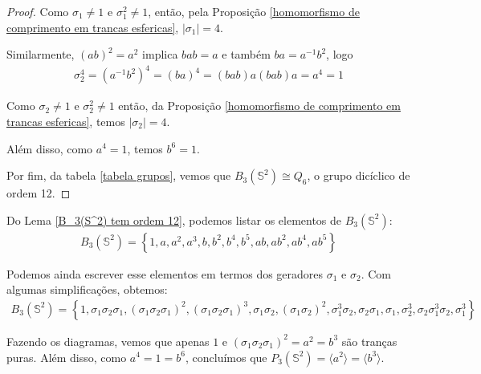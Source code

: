\documentclass[a4paper,portuguese,11pt,twoside, leqno]{book}
\theoremstyle{definition}
\begin{document}
\begin{proof}
		\par\vspace{0.3cm} Como $\sigma_1\neq 1$ e $\sigma_1^2\neq 1$, então, pela Proposição \eqref{homomorfismo de comprimento em trancas esfericas}, $|\sigma_1| = 4$.
		\par\vspace{0.3cm} Similarmente, $(ab)^2 = a^2$ implica $bab=a$ e também $ba=a^{-1}b^2$, logo
		\begin{align*}
		\sigma_2^4 = (a^{-1}b^2)^4 = (ba)^4 = (bab)a(bab)a = a^4 = 1
		\end{align*}
		\par\vspace{0.3cm} Como $\sigma_2\neq1$ e $\sigma_2^2\neq1$ então, da Proposição \eqref{homomorfismo de comprimento em trancas esfericas}, temos $|\sigma_2|=4$. 
		\par\vspace{0.3cm} Além disso, como $a^4 = 1$, temos $b^6=1$.
		\par\vspace{0.3cm} Por fim, da tabela \eqref{tabela grupos}, vemos que $B_3(\mathbb{S}^2)\cong Q_6$, o grupo dicíclico de ordem 12.
	\end{proof}
	
	\par\vspace{0.3cm} Do Lema \eqref{B_3(S^2) tem ordem 12}, podemos listar os elementos de $B_3(\mathbb{S}^2)$:
	\begin{align*}
	B_3(\mathbb{S}^2) = \left\{ 1, a, a^2, a^3, b, b^2, b^4, b^5, ab, ab^2, ab^4, ab^5 \right\}
	\end{align*}
	\par\vspace{0.3cm} Podemos ainda escrever esse elementos em termos dos geradores $\sigma_1$ e $\sigma_2$. Com algumas simplificações, obtemos:
	\begin{align*}
	B_3(\mathbb{S}^2) = \left\{ 1, \sigma_1\sigma_2\sigma_1, (\sigma_1\sigma_2\sigma_1)^2, (\sigma_1\sigma_2\sigma_1)^3, \sigma_1\sigma_2, (\sigma_1\sigma_2)^2, \sigma_1^3\sigma_2, \sigma_2\sigma_1, \sigma_1, \sigma_2^3, \sigma_2\sigma_1^3\sigma_2, \sigma_1^3 \right\}
	\end{align*}
	\par\vspace{0.3cm} Fazendo os diagramas, vemos que apenas $1$ e $(\sigma_1\sigma_2\sigma_1)^2 = a^2 = b^3$ são tranças puras. Além disso, como $a^4 = 1 = b^6$, concluímos que $P_3(\mathbb{S}^2) = \langle a^2 \rangle = \langle b^3 \rangle$.
	
\end{document}
